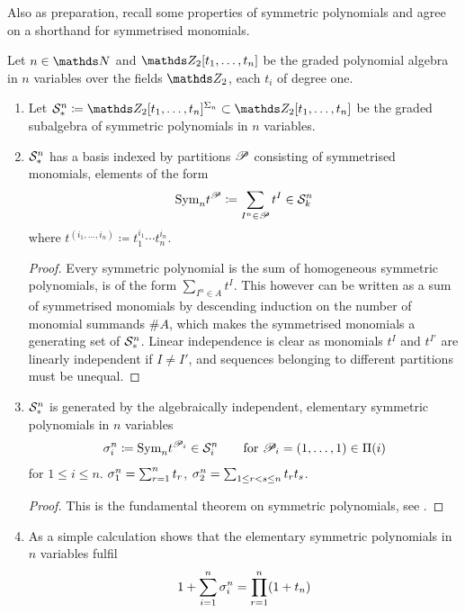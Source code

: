 Also as preparation, recall some properties of symmetric polynomials
and agree on a shorthand for symmetrised monomials.
\begin{LemDef}
  Let $n\in\Nat$ and $\Zmod2[t_1,\dotsc,t_n]$ be the graded polynomial
  algebra in $n$ variables over the fields $\Zmod2$, each $t_i$ of
  degree one.
  \begin{enumerate}
  \item Let
    $\Symm{n}_*
    \coloneqq \Zmod2[t_1,\dotsc,t_n]^{\Permutations{n}}
    \subset \Zmod2[t_1,\dotsc,t_n]$
    be the graded subalgebra of symmetric polynomials in $n$ variables.
  \item $\mathcal{S}^{n}_*$ has a basis indexed by partitions $\mathscr{P}$
    consisting of symmetrised monomials, \idest elements of the form
    \begin{gather*}
      \text{\normalfont Sym}_{n} t^{\mathscr{P}} \coloneqq \sum_{I^n\in\mathscr{P}} t^I \in \mathcal{S}^{n}_k
    \end{gather*}
    where $t^{(i_1,\dotsc,i_n)}\coloneqq t_1^{i_1}\dotsm t_n^{i_n}$.
    \begin{proof}
      Every symmetric polynomial is the sum of homogeneous symmetric
      polynomials, \idest is of the form $\sum_{I^n\in A}t^I$. This
      however can be written as a sum of symmetrised monomials by
      descending induction on the number of monomial summands $\#A$,
      which makes the symmetrised monomials a generating set of $\mathcal{S}^{n}_*$.
      Linear independence is clear as monomials $t^I$ and $t^{I'}$ are
      linearly independent if $I\neq I'$, and sequences belonging to
      different partitions must be unequal.
    \end{proof}
  \item $\mathcal{S}^{n}_*$ is generated by the algebraically independent,
    elementary symmetric polynomials in $n$ variables
    \begin{gather*}
      \sigma_{i}^{n}\coloneqq \text{\normalfont Sym}_{n} t^{\mathscr{P}_i}
      \in \mathcal{S}^{n}_i
      \qquad \text{for }
      \mathscr{P}_i = (1,\dotsc,1)
      \in \Pi({i})
    \end{gather*}
    for $1\leq i\leq n$.
    \Forexample
    $\sigma_{1}^{n}=\sum_{r=1}^{n}t_r$,
    $\sigma_{2}^{n}=\sum_{1\leq r<s\leq n} t_r t_s$.
    \begin{proof}
      This is the fundamental theorem on symmetric polynomials,
      see \forexample \cite[Chapter~4.4, Satz~1]{bosch2013algebra}.
    \end{proof}
  \item As a simple calculation shows that the elementary symmetric
    polynomials in $n$ variables fulfil
    \begin{gather}\label{eq:sumelemsymmpoly}
      1 + \sum_{i=1}^{n} \sigma_{i}^{n}
      = \prod_{r=1}^{n}(1+t_n)
    \end{gather}
  \end{enumerate}
\end{LemDef}

